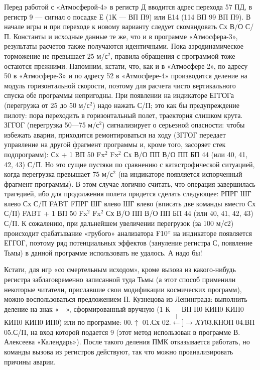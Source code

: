 \documentclass[11pt,a4paper,oneside]{article}
\def\XY{$\stackrel[\leftarrow]{\rightarrow}{XY}$}
\begin{document}
Перед работой с «Атмосферой-4» в регистр Д вводится адрес перехода 57 ПД, в регистр 9 — сигнал о посадке Е (1К — ВП П9) или Е14 (114 ВП 99 ВП П9). В начале игры и при переходе к новому варианту следует скомандовать Сх В/О С/П. Константы и исходные данные те же, что и в программе «Атмосфера-3», результаты расчетов также получаются идентичными. Пока аэродинамическое торможение не превышает 25 м/с$^{2}$, правила обращения с программой тоже остаются прежними. Напомним, кстати, что, как и в «Атмосфере-2», по адресу 50 в «Атмосфере-3» и по адресу 52 в «Атмосфере-4» производится деление на модуль горизонтальной скорости, поэтому для расчета чисто вертикального спуска обе программы непригодны. При появлении на индикаторе ЕГГОГа (перегрузка от 25 до 50 м/с$^{2}$) надо нажать С/П; это как бы предупреждение пилоту: пора переходить в горизонтальный полет, траектория слишком крута. ЗГГОГ (перегрузка 50—75 м/с$^{2}$) сигнализирует о серьезной опасности: чтобы избежать аварии, приходится ремонтироваться на ходу (ЗГГОГ передает управление на другой фрагмент программы и, кроме того, засоряет стек подпрограмм): Сх + 1 ВП 50 Fx$^{2}$ Fx$^{2}$ Сх В/О ПП В/О ПП БП 44 (или 40, 41, 42, 43) С/П. Но это сущие пустяки по сравнению с катастрофической ситуацией, когда перегрузка превышает 75 м/с$^{2}$ (на индикаторе появляется испорченный фрагмент программы). В этом случае логично считать, что операция завершилась трагедией, ибо для продолжения полета придется сделать следующее: РПРГ ШГ влево Сх С/П FABT FПРГ ШГ влево ШГ влево (вписать две команды вместо Сх С/П) FABT + 1 ВП 50 Fx$^{2}$ Fx$^{2}$ Сх В/О ПП В/О ПП БП 44 (или 40, 41, 42, 43) С/П. К сожалению, при дальнейшем увеличении перегрузок (за 100	м/с2) происходит срабатывание «грубого» анализатора F10$^{x}$ на индикаторе появляется ЕГГОГ, поэтому ряд потенциальных эффектов (зануление регистра С, появление Тьмы) в данной программе использовать не удалось. А надо бы!

Кстати, для игр «со смертельным исходом», кроме вызова из какого-нибудь регистра заблаговременно записанной туда Тьмы (а этот способ применили некоторые читатели, приславшие свои модификации космических программ), можно воспользоваться предложением П. Кузнецова из Ленинграда: выполнить деление на знак «—», сформированный вручную (1 К — ВП П0 КИП0 КИП0 КИП0 КИП0 ИП0) или по программе: 00.$\uparrow$ 01.Сх 02.\XY 03.КНОП 04.ВП 05.С/П, на вход которой подается 9 (этот метод использован в программе В. Алексеева «Календарь»). После такого деления ПМК отказывается работать, но команды вызова из регистров действуют, так что можно проанализировать причины аварии.
\end{document}
